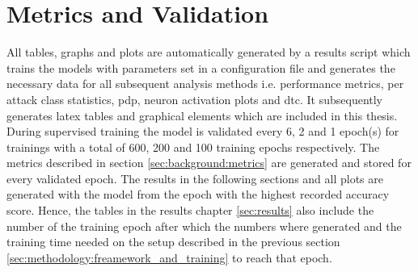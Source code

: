 \section{Metrics and Validation}

All tables, graphs and plots are automatically generated by a results script which trains the models with parameters set in a configuration file and generates the necessary data for all subsequent analysis methods i.e. performance metrics, per attack class statistics, \gls{pdp}, neuron activation plots and \gls{dtc}. It subsequently generates latex tables and graphical elements which are included in this thesis. During supervised training the model is validated every 6, 2 and 1 epoch(s) for trainings with a total of 600, 200 and 100 training epochs respectively. The metrics described in section \ref{sec:background:metrics} are generated and stored for every validated epoch. The results in the following sections and all plots are generated with the model from the epoch with the highest recorded accuracy score. Hence, the tables in the results chapter \ref{sec:results} also include the number of the training epoch after which the numbers where generated and the training time needed on the setup described in the previous section \ref{sec:methodology:freamework_and_training} to reach that epoch.
\newpage